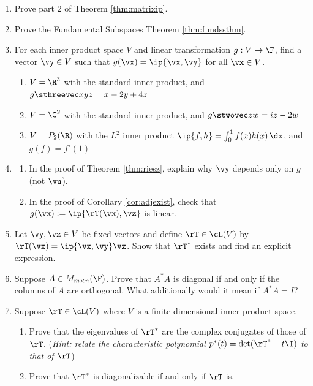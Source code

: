 \begin{exercises}
\begin{enumerate}
  \goodbreak

	\item Prove part 2 of Theorem \ref{thm:matrixip}.

  \item\label{ex:fundssthm} Prove the Fundamental Subspaces Theorem \ref{thm:fundssthm}.
  
  \item For each inner product space $V$ and linear transformation $g:V\to\F$, find a vector $\vy\in V$ such that $g(\vx)=\ip{\vx,\vy}$ for all $\vx\in V$.
  \begin{enumerate}
    \item $V=\R^3$ with the standard inner product, and $g\sthreevec xyz=x-2y+4z$
    \item $V=\C^2$ with the standard inner product, and $g\stwovec zw=iz-2w$
    \item $V=P_2(\R)$ with the $L^2$ inner product $\ip{f,h}=\int_0^1 f(x)h(x)\,\dx$, and $g(f)=f'(1)$
  \end{enumerate}
	
	\goodbreak
  
  
  \item\begin{enumerate}
    \item In the proof of Theorem \ref{thm:riesz}, explain why $\vy$ depends only on $g$ (not $\vu$).
    \item In the proof of Corollary \ref{cor:adjexist}, check that $g(\vx):=\ip{\rT(\vx),\vz}$ is linear.
  \end{enumerate}
  
  \item Let $\vy,\vz\in V$ be fixed vectors and define $\rT\in\cL(V)$ by $\rT(\vx)=\ip{\vx,\vy}\vz$. Show that $\rT^*$ exists and find an explicit expression.
  
  \item Suppose $A\in M_{m\times n}(\F)$. Prove that $A^*A$ is diagonal if and only if the columns of $A$ are orthogonal. What additionally would it mean if $A^*A=I$?
  
 	\item Suppose $\rT\in\cL(V)$ where $V$ is a finite-dimensional inner product space.
 	\begin{enumerate}
 	  \item Prove that the eigenvalues of $\rT^*$ are the complex conjugates of those of $\rT$.\smallbreak
 	  (\emph{Hint: relate the characteristic polynomial $p^*(t)=\det(\rT^*-t\I)$ to that of $\rT$})
 	  \item Prove that $\rT^*$ is diagonalizable if and only if $\rT$ is.
 	\end{enumerate}


\end{enumerate}
\end{exercises}
